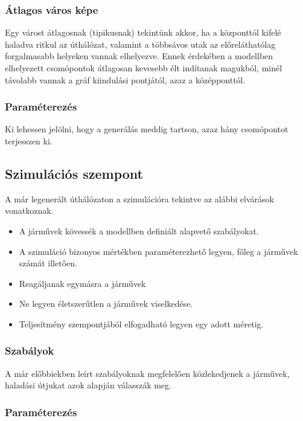 \subsubsection{Átlagos város képe}

Egy várost átlagosnak (tipikusnak) tekintünk akkor, ha a központtól kifelé haladva ritkul az úthálózat, valamint a többsávos utak az előreláthatólag forgalmasabb helyeken vannak elhelyezve. Ennek érdekében a modellben elhelyezett csomópontok átlagosan kevesebb élt indítanak magukból, minél távolabb vannak a gráf kiindulási pontjától, azaz a középponttól.

\subsubsection{Paraméterezés}

Ki lehessen jelölni, hogy a generálás meddig tartson, azaz hány csomópontot terjesszen ki. 

\subsection{Szimulációs szempont}

A már legenerált úthálózaton a szimulációra tekintve az alábbi elvárások vonatkoznak.
\begin{itemize}
\item A járművek kövessék a modellben definiált alapvető szabályokat.
\item A szimuláció bizonyos mértékben paraméterezhető legyen, főleg a járművek számát illetően.
\item Reagáljanak egymásra a járművek
\item Ne legyen életszerűtlen a járművek viselkedése.
\item Teljesítmény szempontjából elfogadható legyen egy adott méretig.
\end{itemize}

\subsubsection{Szabályok}

A már előbbiekben leírt szabályoknak megfelelően közlekedjenek a járművek, haladási útjukat azok alapján válasszák meg.

\subsubsection{Paraméterezés}


